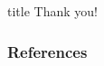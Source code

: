 \documentclass[svgnames,smaller,table,draft]{beamer}
\begin{document}
\begin{frame}
 \vfill
  \begin{beamercolorbox}[center]{title}
     \Huge{Thank you!}
  \end{beamercolorbox}
  \vfill
\end{frame}

\begin{frame}
    \frametitle{References}
    
    
\end{frame}
\end{document}
